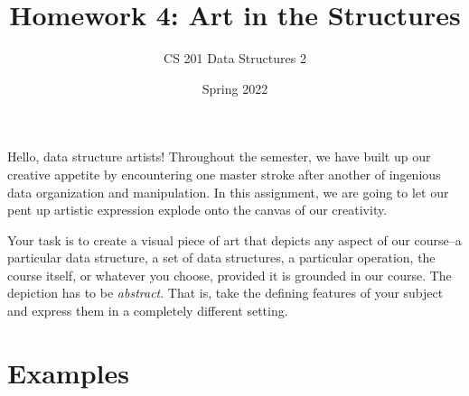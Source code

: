 \documentclass[addpoints]{exam}
\title{Homework 4: Art in the Structures}
\author{CS 201 Data Structures 2}
\date{Spring 2022}
\begin{document}
\maketitle

Hello, data structure artists! Throughout the semester, we have built up our creative appetite by encountering one master stroke after another of ingenious data organization and manipulation. In this assignment, we are going to let our pent up artistic expression explode onto the canvas of our creativity.

Your task is to create a visual piece of art that depicts any aspect of our course--a particular data structure, a set of data structures, a particular operation, the course itself, or whatever you choose, provided it is grounded in our course. The depiction has to be \textit{abstract}. That is, take the defining features of your subject and express them in a completely different setting.

\section*{Examples}
\end{document}
